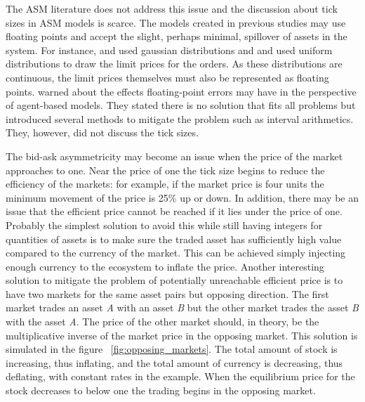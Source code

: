The ASM literature does not address this issue and the discussion about 
tick sizes in ASM models is scarce. The models created in previous studies %
may use floating points and accept the slight, perhaps minimal, spillover 
of assets in the system. For instance, \citet{Raberto05} and \citet{Genoa01} used
gaussian distributions and \citet{Jam96} and \citet{Mil08} used uniform distributions to draw the limit prices 
for the orders. As these distributions are continuous, the limit prices themselves must also be represented as floating 
points. \citet{FloatingPoint06} warned about the effects 
floating-point errors may have in the perspective of agent-based models. 
They stated there is no solution that fits all problems but introduced 
several methods to mitigate the problem such as interval arithmetics. They, 
however, did not discuss the tick sizes.

The bid-ask asymmetricity may become an issue when the price of the market
approaches to one. Near the price of one the tick size begins to reduce the efficiency
of the markets: for example, if the market price is four units the minimum movement 
of the price is 25\% up or down. In addition, there may be an issue that the efficient
price cannot be reached if it lies under the price of one. Probably
the simplest solution to avoid this while still having integers for quantities 
of assets is to make sure the traded asset has sufficiently high value
compared to the currency of the market. This can be achieved simply injecting
enough currency to the ecosystem to inflate the price. Another interesting 
solution to mitigate the problem of potentially unreachable efficient price 
is to have two markets for the same asset pairs but opposing direction. 
The first market trades an asset \textit{A} with an asset \textit{B} but the 
other market trades the asset \textit{B} with the asset \textit{A}. 
The price of the other market should, in theory, be the multiplicative inverse of 
the market price in the opposing market. This solution is simulated in the figure 
~\ref{fig:opposing_markets}. The total amount of stock is increasing, 
thus inflating, and the total amount of currency is decreasing, thus deflating, 
with constant rates in the example. When the equilibrium price for the stock 
decreases to below one the trading begins in the opposing market. 



